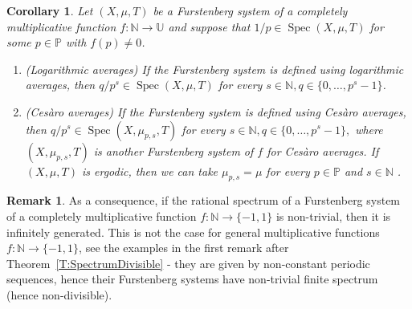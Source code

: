\documentclass[11pt]{amsart}
\newtheorem{corollary}[lemma]{Corollary}
\theoremstyle{definition}
\newtheorem*{remark}{Remark}
\newcommand{\N}{{\mathbb N}}
\renewcommand{\P}{{\mathbb P}}
\newcommand{\U}{{\mathbb U}}
\DeclareMathOperator{\spec}{Spec}
\begin{document}
  \begin{corollary}\label{C:SpectrumDivisible}
  	Let  $(X,\mu, T)$ be a Furstenberg system   of a completely multiplicative function $f\colon\N \to \U$ and suppose that $1/p\in \spec(X,\mu,T)$   for some $p\in \P$ with $f(p)\neq 0$.
  		\begin{enumerate}
  		\item\label{I:SpectrumDivisible1} (Logarithmic averages)  If the Furstenberg system is defined using logarithmic averages,
  	 then  $q/p^s\in \spec(X,\mu,T)$   for every $s\in \N, q\in \{0,\ldots, p^s-1\}$.
  	
  	 \smallskip
  		
  		\item\label{I:SpectrumDivisible2} (Ces\`aro averages) If the Furstenberg system is defined using Ces\`aro averages, then
    	 $q/p^s\in \spec(X,\mu_{p,s},T)$ for  every $s\in \N, q\in \{0,\ldots, p^s-1\},$
  	where $(X,\mu_{p,s},T)$ is another Furstenberg system of $f$ for Ces\`aro averages.
  		If $(X,\mu,T)$ is ergodic, then we can take $\mu_{p,s}=\mu$ for every $p\in \P$ and $s\in \N$ .
  	\end{enumerate}
  \end{corollary}
 \begin{remark}
 	As a consequence, if the rational spectrum of a Furstenberg system of a
 	completely multiplicative  	function $f\colon\N \to \{-1,1\}$ is non-trivial, then it is infinitely generated. This is not the case for general multiplicative functions  $f\colon\N \to \{-1, 1\}$,
 	see the examples in the first remark after Theorem~\ref{T:SpectrumDivisible} -  they are given by non-constant periodic sequences, hence their Furstenberg systems have non-trivial finite  spectrum (hence non-divisible).
 \end{remark}
\end{document}
